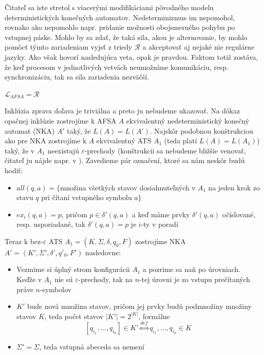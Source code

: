 Čitateľ sa iste stretol s viacerými modifikáciami pôvodného modelu
deterministických konečných automatov. Nedeterminizmus im
nepomohol, rovnako ako nepomohlo napr. pridanie možnosti
obojsmerného pohybu po vstupnej páske. Mohlo by sa zdať, že taká
sila, akou je alternovanie, by mohlo pomôcť týmto zariadeniam
vyjsť z triedy $\mathcal{R}$ a akceptovať aj nejaké nie regulárne
jazyky. Ako však hovorí nasledujúca veta, opak je pravdou. Faktom
totiž zostáva, že keď procesom v jednotlivých vetvách neumožníme
komunikáciu, resp. synchronizáciu, tak sa sila zariadenia
nezväčší.

\begin{veta}
$\mathcal{L}_{AFSA}=\mathcal{R}$
\end{veta}

\begin{dokaz}
\label{afsa_r} Inklúzia zprava doľava je triviálna a preto ju
nebudeme ukazovať. Na dôkaz opačnej inklúzie zostrojíme k AFSA $A$
ekvivalentný nedeterministický konečný automat (NKA) $A'$ taký, že
\mbox{$L(A)=L(A')$}. Najskôr podobnou konštrukciou ako pre NKA
zostrojíme k $A$ ekvivalentný ATS $A_1$ (teda platí $L(A)=L(A_1)$)
taký, že v $A_1$ neexistujú $\varepsilon$-prechody (konštrukcii sa
nebudeme bližšie venovať, čitateľ ju nájde napr. v \cite{Hopc}).
Zavedieme pár označení, ktoré sa nám neskôr budú hodiť:
\begin{itemize}
\item $all(q,a)=\{$množina všetkých stavov dosiahnuteľných v $A_1$ na
jeden krok zo stavu $q$ pri čítaní vstupného symbolu $a\}$
\item $ex_i(q,a)=p$, pričom $p\in\delta'(q,a)$ a keď máme prvky
$\delta'(q,a)$ očíslované, resp. usporiadané, tak $\delta'(q,a)=p$
je $i$-ty v poradí
\end{itemize}
Teraz k bez-$\varepsilon$ ATS $A_1=(K,\Sigma,\delta,q_0,F)$
zostrojíme NKA $A'=(K',\Sigma',\delta',q'_0,F')$ nasledovne:
\begin{itemize}
\item Vezmime si úplný strom konfigurácii $A_1$ a pozrime sa naň
po úrovniach. Keďže v $A_1$ nie sú $\varepsilon$-prechody, tak na
$n$-tej úrovni je zo vstupu prečítaných práve $n$-symbolov
\item $K'$ bude nová množina stavov, pričom jej prvky budú podmnožiny
množiny stavov $K$, teda počet stavov $|K'|=2^{|K|}$, formálne
\[
[q_{i_1},\dots,q_{i_k}]\in K'\overset{def}{\Longleftrightarrow}
q_{i_1},\dots,q_{i_k}\in K
\]
\item $\Sigma'=\Sigma$, teda vstupná abeceda sa nemení

\end{itemize}
\end{dokaz}

